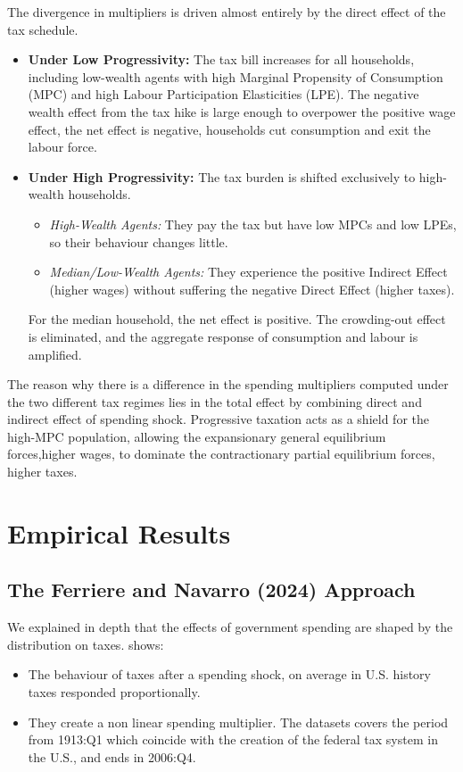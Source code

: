 \documentclass[12pt,letterpaper]{article}
\begin{document}
The divergence in multipliers is driven almost entirely by the direct effect of the tax schedule.

\begin{itemize}
    \item \textbf{Under Low Progressivity:} The tax bill increases for all households, including low-wealth agents with high Marginal Propensity of Consumption (MPC) and high Labour Participation Elasticities (LPE). The negative wealth effect from the tax hike is large enough to overpower the positive wage effect, the net effect is negative, households cut consumption and exit the labour force.

    \item \textbf{Under High Progressivity:} The tax burden is shifted exclusively to high-wealth households.
    \begin{itemize}
        \item \textit{High-Wealth Agents:} They pay the tax but have low MPCs and low LPEs, so their behaviour changes little.
        \item \textit{Median/Low-Wealth Agents:} They experience the positive Indirect Effect (higher wages) without suffering the negative Direct Effect (higher taxes).
    \end{itemize}
    For the median household, the net effect is positive. The crowding-out effect is eliminated, and the aggregate response of consumption and labour is amplified.
\end{itemize}

The reason why there is a difference in the spending multipliers computed under the two different tax regimes lies in the total effect by combining direct and indirect effect of spending shock.
Progressive taxation acts as a shield for the high-MPC population, allowing the expansionary general equilibrium forces,higher wages, to dominate the contractionary partial equilibrium forces, higher taxes.





\section{Empirical Results}
\subsection{The Ferriere and Navarro (2024) Approach}
We explained in depth that the effects of government spending are shaped by the distribution on taxes.
\cite{FN} shows: 
\begin{itemize}
    \item The behaviour of taxes after a spending shock, on average in U.S. history taxes responded proportionally.
    \item They create a non linear spending multiplier.
The datasets covers the period from 1913:Q1 which coincide with the creation of the federal tax system in the U.S., and ends in 2006:Q4.
\end{itemize}
\end{document}
